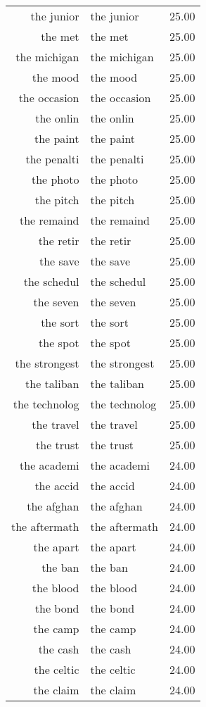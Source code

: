 \begin{table}[ht]
\begin{tabular}{rlr}
  the junior & the junior & 25.00 \\ 
  the met & the met & 25.00 \\ 
  the michigan & the michigan & 25.00 \\ 
  the mood & the mood & 25.00 \\ 
  the occasion & the occasion & 25.00 \\ 
  the onlin & the onlin & 25.00 \\ 
  the paint & the paint & 25.00 \\ 
  the penalti & the penalti & 25.00 \\ 
  the photo & the photo & 25.00 \\ 
  the pitch & the pitch & 25.00 \\ 
  the remaind & the remaind & 25.00 \\ 
  the retir & the retir & 25.00 \\ 
  the save & the save & 25.00 \\ 
  the schedul & the schedul & 25.00 \\ 
  the seven & the seven & 25.00 \\ 
  the sort & the sort & 25.00 \\ 
  the spot & the spot & 25.00 \\ 
  the strongest & the strongest & 25.00 \\ 
  the taliban & the taliban & 25.00 \\ 
  the technolog & the technolog & 25.00 \\ 
  the travel & the travel & 25.00 \\ 
  the trust & the trust & 25.00 \\ 
  the academi & the academi & 24.00 \\ 
  the accid & the accid & 24.00 \\ 
  the afghan & the afghan & 24.00 \\ 
  the aftermath & the aftermath & 24.00 \\ 
  the apart & the apart & 24.00 \\ 
  the ban & the ban & 24.00 \\ 
  the blood & the blood & 24.00 \\ 
  the bond & the bond & 24.00 \\ 
  the camp & the camp & 24.00 \\ 
  the cash & the cash & 24.00 \\ 
  the celtic & the celtic & 24.00 \\ 
  the claim & the claim & 24.00 \\ 

\end{tabular}
\end{table}
